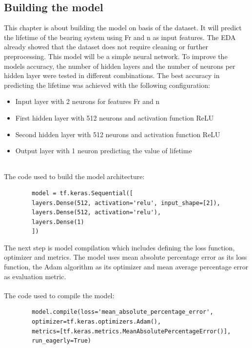 \documentclass[letterpaper,10pt]{article}
\begin{document}
	
	
	
	
	
	
	
	
	
	
	
	
	
	
	\subsection{Building the model}
	This chapter is about building the model on basis of the dataset. It will predict the lifetime of the bearing system using Fr and n as input features. The EDA already showed that the dataset does not require cleaning or further preprocessing.
	\newline This model will be a simple neural network. To improve the models accuracy, the number of hidden layers and the number of neurons per hidden layer were tested in different combinations. The best accuracy in predicting the lifetime was achieved with the following configuration: 
	\begin{itemize}
		\item Input layer with 2 neurons for features Fr and n
		\item First hidden layer with 512 neurons and activation function ReLU
		\item Second hidden layer with 512 neurons and activation function ReLU
		\item Output layer with 1 neuron predicting the value of lifetime
	\end{itemize} 
	\ \\The code used to build the model architecture:
	\begin{lstlisting}
		model = tf.keras.Sequential([
		layers.Dense(512, activation='relu', input_shape=[2]), 
		layers.Dense(512, activation='relu'),  
		layers.Dense(1)
		])
	\end{lstlisting}
	The next step is model compilation which includes defining the loss function, optimizer and metrics. The model uses mean absolute percentage error as its loss function, the Adam algorithm as its optimizer and mean average percentage error as evaluation metric. 
	\\ \\ The code used to compile the model:
	\begin{lstlisting}
		model.compile(loss='mean_absolute_percentage_error',
		optimizer=tf.keras.optimizers.Adam(),
		metrics=[tf.keras.metrics.MeanAbsolutePercentageError()],
		run_eagerly=True)
	\end{lstlisting}
\end{document}
